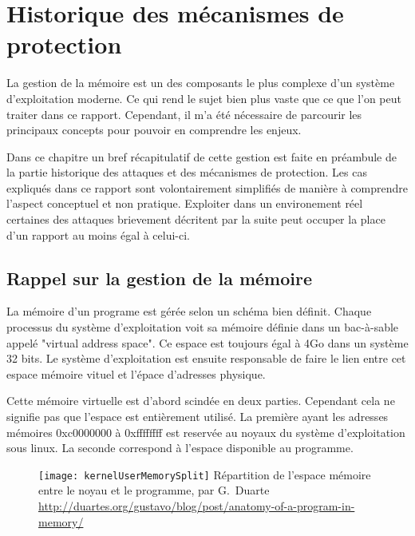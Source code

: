 \chapter{Historique des mécanismes de protection}
\label{chap:historique}

La gestion de la mémoire est un des composants le plus complexe d'un système d'exploitation moderne. Ce qui rend le sujet bien plus vaste que ce que l'on peut traiter dans ce rapport. Cependant, il m'a été nécessaire de parcourir les principaux concepts pour pouvoir en comprendre les enjeux.

Dans ce chapitre un bref récapitulatif de cette gestion est faite en préambule de la partie historique des attaques et des mécanismes de protection. Les cas expliqués dans ce rapport sont volontairement simplifiés de manière à comprendre l'aspect conceptuel et non pratique. Exploiter dans un environement réel certaines des attaques brievement décritent par la suite peut occuper la place d'un rapport au moins égal à celui-ci.

\minitoc

\newpage

\section{Rappel sur la gestion de la mémoire}

La mémoire d'un programe est gérée selon un schéma bien définit. Chaque processus du système d'exploitation voit sa mémoire définie dans un bac-à-sable appelé "virtual address space". Ce espace est toujours égal à 4Go dans un système 32 bits. Le système d'exploitation est ensuite responsable de faire le lien entre cet espace mémoire vituel et l'épace d'adresses physique.

Cette mémoire virtuelle est d'abord scindée en deux parties. Cependant cela ne signifie pas que l'espace est entièrement utilisé. La première ayant les adresses mémoires 0xc0000000 à 0xffffffff est reservée au noyaux du système d'exploitation sous linux. La seconde correspond à l'espace disponible au programme.

\begin{figure}[H]
	\texttt{[image: kernelUserMemorySplit]}
	{Répartition de l'espace mémoire entre le noyau et le programme, par G.~Duarte}
	{\url{http://duartes.org/gustavo/blog/post/anatomy-of-a-program-in-memory/}}
	\label{fig:kernelUserMemorySplit}
\end{figure}

